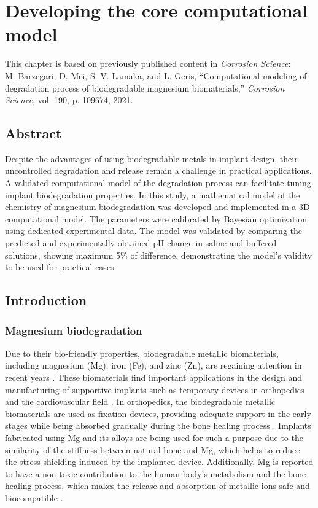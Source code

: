 \chapter{Developing the core computational model}\label{ch:core}

\begin{tcolorbox}
This chapter is based on previously published content in \textit{Corrosion Science}:\\
M. Barzegari, D. Mei, S. V. Lamaka, and L. Geris, ``Computational modeling of degradation process of biodegradable magnesium biomaterials,'' \textit{Corrosion Science}, vol. 190, p. 109674, 2021.
\end{tcolorbox}

\section*{Abstract}
Despite the advantages of using biodegradable metals in implant design, their uncontrolled degradation and release remain a challenge in practical applications. A validated computational model of the degradation process can facilitate tuning implant biodegradation properties. In this study, a mathematical model of the chemistry of magnesium biodegradation was developed and implemented in a 3D computational model. The parameters were calibrated by Bayesian optimization using dedicated experimental data. The model was validated by comparing the predicted and experimentally obtained pH change in saline and buffered solutions, showing maximum 5\% of difference, demonstrating the model's validity to be used for practical cases.


\section{Introduction}

\subsection{Magnesium biodegradation}

Due to their bio-friendly properties, biodegradable metallic biomaterials, including magnesium (Mg), iron (Fe), and zinc (Zn), are regaining attention in recent years \cite{Zheng2014}. These biomaterials find important applications in the design and manufacturing of supportive implants such as temporary devices in orthopedics and the cardiovascular field  \cite{Chen2014,Zhao2017}. In orthopedics, the biodegradable metallic biomaterials are used as fixation devices, providing adequate support in the early stages while being absorbed gradually during the bone healing process \cite{Qin2019}. Implants fabricated using Mg and its alloys are being used for such a purpose \cite{Riaz2018} due to the similarity of the stiffness between natural bone and Mg, which helps to reduce the stress shielding induced by the implanted device. Additionally, Mg is reported to have a non-toxic contribution to the human body's metabolism and the bone healing process, which makes the release and absorption of metallic ions safe and biocompatible \cite{Xin2008}.

